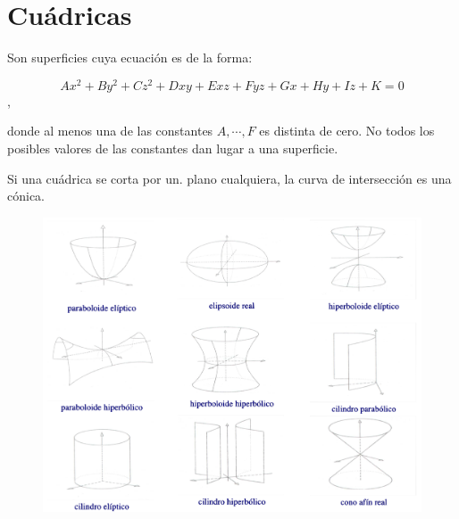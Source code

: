 \section{Cuádricas}

Son superficies cuya ecuación es de la forma:

$$ Ax^2+By^2+Cz^2+Dxy+Exz+Fyz+Gx+Hy+Iz+K=0$$,

donde al menos una de las constantes $A, \cdots , F$ es distinta de cero. No todos los posibles valores de las constantes dan lugar a una superficie.

Si una cuádrica se corta por un. plano cualquiera, la curva de intersección es una cónica.

	\begin{figure}[H]
		\centering
		\includegraphics[width=1\textwidth]{imagenes/imagenes12/T12IM08.png}
	\end{figure}






